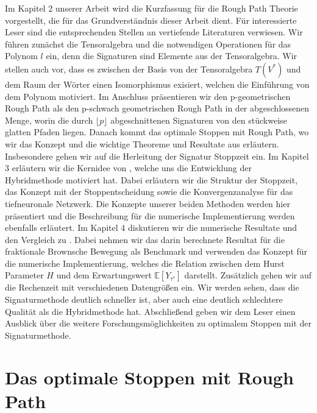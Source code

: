 \documentclass[12pt,titlepage,headsepline]{article}
\begin{document}
    \hfill\break
    Im Kapitel 2 unserer Arbeit wird die Kurzfassung für die Rough Path Theorie vorgestellt, die für das Grundverständnis dieser Arbeit dient. Für interessierte Leser sind die entsprechenden Stellen an vertiefende Literaturen verwiesen. Wir führen zunächst die Tensoralgebra und die notwendigen Operationen für das Polynom $l$ ein, denn die Signaturen sind Elemente aus der Tensoralgebra. Wir stellen auch vor, dass es zwischen der Basis von der Tensoralgebra $T(V^*)$ und dem Raum der Wörter einen Isomorphismus exisiert, welchen die Einführung von dem Polynom motiviert. Im Anschluss präsentieren wir den p-geometrischen Rough Path als den p-schwach geometrischen Rough Path in der abgeschlossenen Menge, worin die durch $\lfloor p \rfloor$ abgeschnittenen Signaturen von den stückweise glatten Pfaden liegen. Danach kommt das optimale Stoppen mit Rough Path, wo wir das Konzept und die wichtige Theoreme und Resultate aus \cite{bayer_optimal_2020} erläutern. Insbesondere gehen wir auf die Herleitung der Signatur Stoppzeit ein.
    Im Kapitel 3 erläutern wir die Kernidee von \cite{becker_deep_2019}, welche uns die Entwicklung der Hybridmethode motiviert hat. Dabei erläutern wir die Struktur der Stoppzeit, das Konzept mit der Stoppentscheidung sowie die Konvergenzanalyse für das tiefneuronale Netzwerk. Die Konzepte unserer beiden Methoden werden hier präsentiert und die Beschreibung für die numerische Implementierung werden ebenfalls erläutert.
    Im Kapitel 4 diskutieren wir die numerische Resultate und den Vergleich zu \cite{becker_deep_2019}. Dabei nehmen wir das darin berechnete Resultat für die fraktionale Brownsche Bewegung als Benchmark und verwenden das Konzept für die numerische Implementierung, welches die Relation zwischen dem Hurst Parameter $H$ und dem Erwartungswert $\mathbb{E}[Y_{\tau^*}]$ darstellt. Zusätzlich gehen wir auf die Rechenzeit mit verschiedenen Datengrößen ein. Wir werden sehen, dass die Signaturmethode deutlich schneller ist, aber auch eine deutlich schlechtere Qualität als die Hybridmethode hat.
    Abschließend geben wir dem Leser einen Ausblick über die weitere Forschungsmöglichkeiten zu optimalem Stoppen mit der Signaturmethode.
    \newpage

    \section{Das optimale Stoppen mit Rough Path}\label{chapter: opt_stop_with_rough_path}
\end{document}
